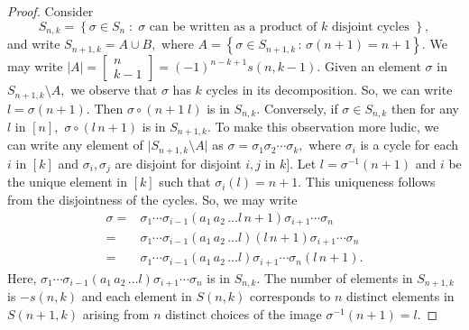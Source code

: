 \begin{proof}
Consider $$S_{n,k} = \left\{ \sigma \in S_n \; : \;
\sigma \text{ can be written as a product of }
k \text{ disjoint cycles } \right\}, $$
and write $S_{n+1, k} = A \cup B,$ where
$A = \left\{ \sigma \in S_{n+1, k}  \, : \, \sigma(n+1) = n+1 \right\} .$
We may write $ \lvert A \rvert = \begin{bmatrix} n \\ k-1 \end{bmatrix} = (-1)^{n-k+1} s(n, k-1) .$
Given an element $ \sigma$ in $S_{n+1,k} \setminus A,$ we observe that
$\sigma$ has $k$ cycles in its decomposition. So, we can write $l= 
\sigma(n+1).$ Then $\sigma \circ (n+1 \; l)$ is in $S_{n,k}.$
Conversely, if $\sigma \in S_{n,k}$ then for any $l$ in $[n],$
$\sigma \circ (l \, n+1)$ is in $S_{n+1,k}.$
To make this observation more ludic, we can write any element of $ \lvert S_{n+1,k} \setminus A \rvert $ 
as $\sigma = \sigma_1 \sigma_2 \cdots \sigma_k,$ where $\sigma_i$ is 
a cycle for each $i$ in $[k]$ and $\sigma_i, \sigma_j$ are disjoint for
disjoint $i,j$ in $k].$ Let $l = \sigma^{-1}(n+1)$ and $i$ be
the unique element in $[k]$ such that $\sigma_i(l) = n+1.$
This uniqueness follows from the disjointness of the cycles.
So, we may write 
\begin{align*}
	\sigma ={}& \sigma_1 \cdots \sigma_{i-1} (a_1 \, a_2 \, \dotsc l \, n+1) \sigma_{i+1} \cdots \sigma_n \\
	={}& \sigma_1 \cdots \sigma_{i-1} (a_1 \, a_2 \, \dotsc l ) (l \, n+1) \sigma_{i+1} \cdots \sigma_n \\
	={}& \sigma_1 \cdots \sigma_{i-1} (a_1 \, a_2 \, \dotsc l ) \sigma_{i+1} \cdots \sigma_n (l \, n+1).
\end{align*}
Here,  $\sigma_1 \cdots \sigma_{i-1} (a_1 \, a_2 \, \dotsc l ) \sigma_{i+1} \cdots \sigma_n $ is in $S_{n,k}.$
The number of elements in $S_{n+1,k}$ is $-s(n,k)$ and each element in 
$S(n,k)$ corresponds to $n$ distinct elements in $S(n+1,k)$ arising from $n$ distinct choices of the image $\sigma^{-1}(n+1) = l.$
\end{proof}
